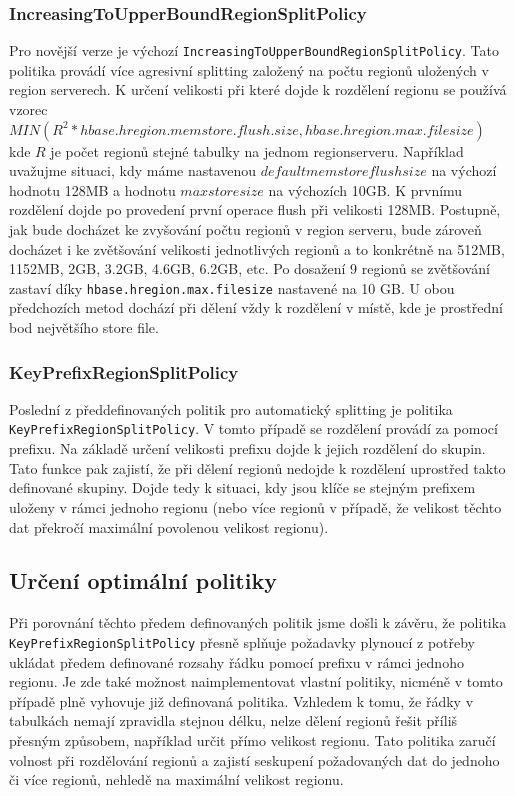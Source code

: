 \documentclass[thesis=M,czech]{FITthesis}[2012/06/26]
\begin{document}
\subsubsection{IncreasingToUpperBoundRegionSplitPolicy}
Pro novější verze je výchozí \texttt{IncreasingToUpperBoundRegionSplitPolicy}. \linebreak Tato politika provádí více agresivní splitting  založený na počtu regionů uložených v region serverech. K určení velikosti při které dojde k rozdělení regionu se používá vzorec \\  $MIN(R^2 * hbase.hregion.memstore.flush.size,hbase.hregion.max.filesize)$ \\ kde $R$ je počet regionů stejné tabulky na jednom regionserveru. Například uvažujme situaci, kdy máme nastavenou $default memstore flush size$ na výchozí hodnotu 128MB a hodnotu $max store size$ na výchozích 10GB. K prvnímu rozdělení dojde po provedení první operace flush při velikosti 128MB. Postupně, jak bude docházet ke zvyšování počtu regionů v region serveru, bude zároveň docházet i ke zvětšování velikosti jednotlivých regionů a to konkrétně na 512MB, 1152MB, 2GB, 3.2GB, 4.6GB, 6.2GB, etc. Po dosažení 9 regionů se zvětšování zastaví díky \texttt{hbase.hregion.max.filesize} nastavené na 10 GB. U obou předchozích metod dochází při dělení vždy k rozdělení v místě, kde je prostřední bod největšího store file.


\subsubsection{KeyPrefixRegionSplitPolicy}
Poslední z předdefinovaných politik pro automatický splitting je politika \\ \texttt{KeyPrefixRegionSplitPolicy}. V tomto případě se rozdělení provádí za pomocí prefixu. Na základě určení velikosti prefixu dojde k jejich rozdělení do skupin. Tato funkce pak zajistí, že při dělení regionů nedojde k rozdělení uprostřed takto definované skupiny. Dojde tedy k situaci, kdy jsou klíče se stejným prefixem uloženy v rámci jednoho regionu (nebo více regionů v případě, že velikost těchto dat překročí maximální povolenou velikost regionu).

\subsection{Určení optimální politiky}
Při porovnání těchto předem definovaných politik jsme došli k závěru, že politika \texttt{KeyPrefixRegionSplitPolicy} přesně splňuje požadavky plynoucí z potřeby ukládat předem definované rozsahy řádku pomocí prefixu v rámci jednoho regionu. Je zde také možnost naimplementovat vlastní politiky, nicméně v tomto případě plně vyhovuje již definovaná politika. Vzhledem k tomu, že řádky v tabulkách nemají zpravidla stejnou délku, nelze dělení regionů řešit příliš přesným způsobem, například určit přímo velikost regionu. Tato politika zaručí volnost při rozdělování regionů a zajistí seskupení požadovaných dat do jednoho či více regionů, nehledě na maximální velikost regionu.
\end{document}
